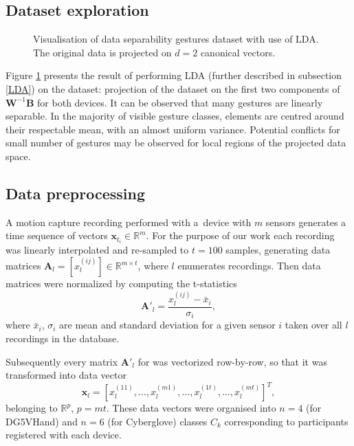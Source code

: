 \documentclass[]{article}
\newcommand{\vecb}[1]{\mathbf{#1}}
\newcommand{\matb}[1]{\mathbf{#1}}
\newcommand{\R}{\mathbb{R}}
\begin{document}
\subsection{Dataset exploration}

\begin{figure}[h]
 \centering
{}
  \caption{Visualisation of data separability gestures dataset with use of LDA. The original data is projected on $d=2$ canonical vectors.}
  \label{fig:lda_projection}
\end{figure}

Figure \ref{fig:lda_projection} presents the result of performing LDA (further described in subsection \ref{LDA}) on the
dataset: projection of the dataset on the first two components of 
$\mathbf{W}^{-1}\mathbf{B}$ for both devices. It can be observed that many
gestures are linearly separable.  In the majority of visible gesture classes,
elements are centred around their respectable mean, with an almost uniform
variance. Potential conflicts for small number of gestures may be observed for
local regions of the projected data space.

\subsection{Data preprocessing}
\label{id:section:preprocessing}
A motion capture recording performed with a~device with $m$ sensors
generates a time sequence of vectors $\vecb{x}_{t_i}\in \mathbb{R}^m$. For the 
purpose of our work each recording was linearly interpolated and re-sampled to 
$t=100$ samples, generating data matrices
$\matb{A}_l=[x_{l}^{(ij)}]\in\R^{m\times t}$, where $l$ enumerates  recordings.
Then data matrices were normalized by computing the
t-statistics 
\begin{equation*}
\matb{A}'_l=\frac{x_{l}^{(ij)}-\bar{x}_i}{\sigma_i}, 
\end{equation*}
where $\bar{x}_i$, $\sigma_i$ are mean and standard deviation for a given 
sensor $i$ taken over all $l$ recordings in the database.

Subsequently every matrix $\matb{A}'_l$ for was vectorized row-by-row, so that
it was transformed into data vector 
\begin{equation*}
\vecb{x}_l=[x^{(11)}_l,\ldots,x^{(m1)}_l,\ldots,x^{(1t)}_l,\ldots,x^{(mt)}_l]^T,
\end{equation*}
belonging to $\R^p$, $p=m t$. 
These data vectors were organised into $n=4$ (for DG5VHand) and $n=6$ (for
Cyberglove) classes $C_k$ corresponding to participants registered
with each device.
\end{document}
